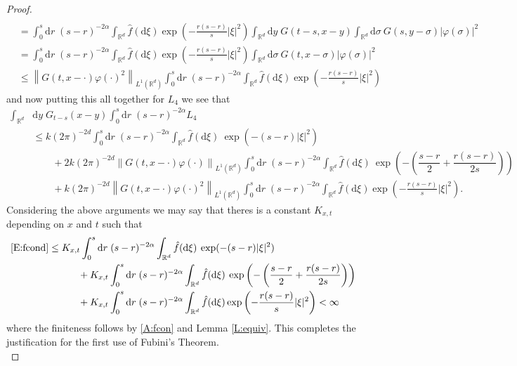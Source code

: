 \documentclass[a4paper,11pt]{article}
\numberwithin{equation}{section}
\theoremstyle{plain}
\theoremstyle{definition}
\newcommand{\R}{\mathbb{R}}
\newcommand{\Norm}[1]{\left\|  #1   \right\|}
\newcommand{\ud}{\ensuremath{\mathrm{d}}}
\begin{document}
\begin{proof}
\begin{align*}
\\&= \int_0^s\ud r\; (s-r)^{-2\alpha}\int_{\R^d} \hat{f}(\ud \xi)\exp\left(-\frac{r(s-r)}{s}|\xi|^2\right)\int_{\R^d}\ud y \;G(t-s,x-y) \int_{\R^{d}}\ud \sigma\:G(s,y-\sigma)|\varphi(\sigma)|^2
\\&= \int_0^s\ud r\; (s-r)^{-2\alpha}\int_{\R^d} \hat{f}(\ud \xi)\exp\left(-\frac{r(s-r)}{s}|\xi|^2\right)\int_{\R^{d}}\ud \sigma\:G(t,x-\sigma)|\varphi(\sigma)|^2
\\&\le \Norm{G(t,x-\cdot)\varphi(\cdot)^2}_{L^1(\R^d)} \int_0^s\ud r\; (s-r)^{-2\alpha}\int_{\R^d} \hat{f}(\ud \xi)\exp\left(-\frac{r(s-r)}{s}|\xi|^2\right)
\end{align*}
and now putting this all together for $L_4$ we see that 
\begin{align*}
\int_{\R^d}& \ud y \;G_{t-s}(x-y)\int_0^s\ud r\; (s-r)^{-2\alpha}L_4
\\ &\le k (2\pi)^{-2d}\int_0^s\ud r\; (s-r)^{-2\alpha}\int_{\R^d}\hat f (\ud \xi)\: \exp(-(s-r)|\xi|^2)
\\&\hspace{2em}+ 2 k  (2\pi)^{-2d} \Norm{G(t,x-\cdot)\varphi(\cdot)}_{L^1(\R^d)}\int_0^s\ud r\; (s-r)^{-2\alpha}\int_{\R^d}\hat f(\ud \xi) \: \exp\left(-\left(\dfrac{s-r}{2}+\dfrac{r(s-r)}{2s}\right)\right)
\\&\hspace{2em} + k (2\pi)^{-2d}  \Norm{G(t,x-\cdot)\varphi(\cdot)^2}_{L^1(\R^d)} \int_0^s\ud r\; (s-r)^{-2\alpha}\int_{\R^d} \hat{f}(\ud \xi)\exp\left(-\frac{r(s-r)}{s}|\xi|^2\right).
\end{align*}
Considering the above arguments we may say that theres is a constant $K_{x,t}$ depending on $x$ and $t$ such that
\begin{align*}
\eqref{E:fcond} &\le K_{x,t}\int_0^s\ud r\; (s-r)^{-2\alpha}\int_{\R^d}\hat f (\ud \xi)\: \exp(-(s-r)|\xi|^2)
\\&\hspace{3em}+ K_{x,t}\int_0^s\ud r\; (s-r)^{-2\alpha}\int_{\R^d}\hat f(\ud \xi) \: \exp\left(-\left(\dfrac{s-r}{2}+\dfrac{r(s-r)}{2s}\right)\right)
\\&\hspace{3em} + K_{x,t}\int_0^s\ud r\; (s-r)^{-2\alpha}\int_{\R^d} \hat{f}(\ud \xi)\exp\left(-\frac{r(s-r)}{s}|\xi|^2\right) < \infty
\end{align*}
where the finiteness follows by \eqref{A:fcon} and Lemma \ref{L:equiv}. This completes the justification for the first use of Fubini's Theorem. \\
\end{proof}
\end{document}
